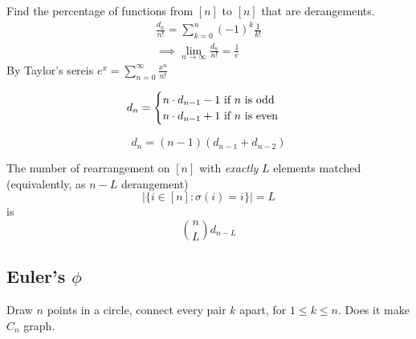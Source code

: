 \documentclass{article}
\begin{document}
				\begin{theorem}
					Find the percentage of functions from $[n]$ to $[n]$ that are derangements.
					\begin{gather}
						\frac{d_n}{n!} = \sum_{k=0}^n (-1)^k \frac{1}{k!} \\
						\implies \lim_{n\to \infty} \frac{d_n}{n!} = \frac{1}{e}
					\end{gather}
					By Taylor's sereis $e^x = \sum_{n=0}^\infty \frac{x^n}{n!}$
				\end{theorem}
				
				\begin{proposition}
					\begin{equation}
						d_n = \begin{cases}
							n \cdot d_{n-1} - 1 \text{{ if $n$ is odd}} \\
							n \cdot d_{n-1} + 1 \text{{ if $n$ is even}}
						\end{cases}
					\end{equation}
				\end{proposition}
				
				\begin{proposition}
					\begin{equation}
						d_n = (n-1)(d_{n-1} + d_{n-2})
					\end{equation}
				\end{proposition}
				
				\begin{example}
					The number of rearrangement on $[n]$ with \emph{exactly} $L$ elements matched (equivalently, as $n-L$ derangement)
					\begin{equation}
						\left \vert \{i \in [n]: \sigma(i) = i\} \right \vert = L
					\end{equation}
					is
					\begin{equation}
						\binom{n}{L} d_{n-L}
					\end{equation}
				\end{example}
				
			\subsection{Euler's $\phi$}
				\begin{example}
					Draw $n$ points in a circle, connect every pair $k$ apart, for $1 \leq k  \leq n$. Does it make $C_n$ graph.
				\end{example}
				
\end{document}
